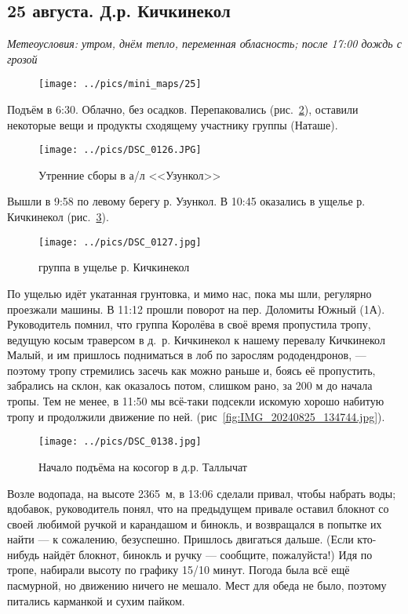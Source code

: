 \subsection{25 августа. Д.р. Кичкинекол}
\textit{Метеоусловия: утром, днём тепло, переменная обласность; после 17:00 дождь с грозой}

\begin{figure}[h!]
	\centering
	\texttt{[image: ../pics/mini\_maps/25]}
	\label{fig:mini_25}
\end{figure}

Подъём в 6:30. Облачно, без осадков. Перепаковались (рис.~\ref{fig:DSC_0126.JPG}), оставили некоторые вещи и продукты сходящему участнику группы (Наташе). 

\begin{figure}[h!]
	\centering
	\texttt{[image: ../pics/DSC\_0126.JPG]}
	\caption{Утренние сборы в а/л <<Узункол>>}
	\label{fig:DSC_0126.JPG}
\end{figure}

Вышли в 9:58 по левому берегу р. Узункол. В 10:45 оказались в ущелье р. Кичкинекол (рис.~\ref{fig:DSC_0127.JPG}). 

\begin{figure}[h!]
	\centering
	\texttt{[image: ../pics/DSC\_0127.jpg]}
	\caption{группа в ущелье р. Кичкинекол}
	\label{fig:DSC_0127.JPG}
\end{figure}


По ущелью идёт укатанная грунтовка, и мимо нас, пока мы шли, регулярно проезжали машины. В 11:12 прошли поворот на пер. Доломиты Южный (1А). Руководитель помнил, что группа Королёва \cite{Korolyov2018} в своё время пропустила тропу, ведущую косым траверсом в д.~р. Кичкинекол к нашему перевалу Кичкинекол Малый, и им пришлось подниматься в лоб по зарослям рододендронов, --- поэтому тропу стремились засечь как можно раньше и, боясь её пропустить, забрались на склон, как оказалось потом, слишком рано, за 200 м до начала тропы. Тем не менее, в 11:50 мы всё-таки подсекли искомую хорошо набитую тропу и продолжили движение по ней. (рис~\ref{fig:IMG_20240825_134744.jpg}).  
	
	\begin{figure}[h!]
		\centering
		\texttt{[image: ../pics/DSC\_0138.jpg]}
		\caption{Начало подъёма на косогор в д.р. Таллычат}
		\label{fig:DSC_0138.JPG}
	\end{figure}
	
Возле водопада, на высоте 2365~м, в 13:06 сделали привал, чтобы набрать воды; вдобавок, руководитель понял, что на предыдущем привале оставил блокнот со своей любимой ручкой и карандашом и бинокль, и возвращался в попытке их найти --- к сожалению, безуспешно. Пришлось двигаться дальше. (Если кто-нибудь найдёт блокнот, бинокль и ручку --- сообщите, пожалуйста!) Идя по тропе, набирали высоту по графику 15/10 минут. Погода была всё ещё пасмурной, но движению ничего не мешало. Мест для обеда не было, поэтому питались карманкой и сухим пайком.

